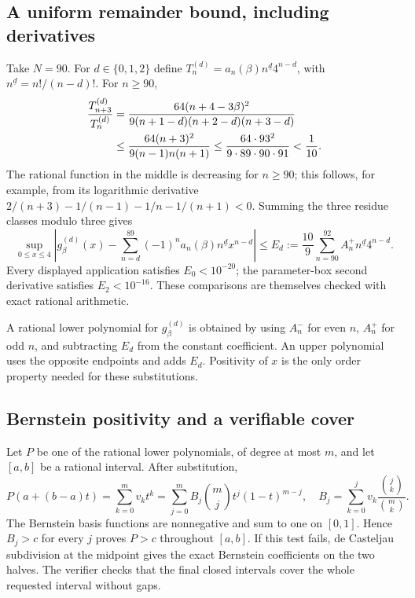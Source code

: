 \documentclass[11pt,a4paper]{article}
\numberwithin{equation}{section}
\theoremstyle{definition}\newtheorem{definition}[theorem]{Definition}
\theoremstyle{remark}\newtheorem{remark}[theorem]{Remark}
\begin{document}
\subsection{A uniform remainder bound, including derivatives}

Take \(N=90\). For \(d\in\{0,1,2\}\) define
\(T_n^{(d)}=a_n(\beta)n^{\underline d}4^{n-d}\), with
\(n^{\underline d}=n!/(n-d)!\). For \(n\ge90\),
\begin{align}
 \frac{T_{n+3}^{(d)}}{T_n^{(d)}}
 &=\frac{64(n+4-3\beta)^2}
 {9(n+1-d)(n+2-d)(n+3-d)}\notag\\
 &\le\frac{64(n+3)^2}{9(n-1)n(n+1)}
 \le\frac{64\cdot93^2}{9\cdot89\cdot90\cdot91}
 <\frac1{10}.\label{eq:tail-ratio}
\end{align}
The rational function in the middle is decreasing for \(n\ge90\);
this follows, for example, from its logarithmic derivative
\(2/(n+3)-1/(n-1)-1/n-1/(n+1)<0\).
Summing the three residue classes modulo three gives
\begin{equation}\label{eq:tail-cert}
 \sup_{0\le x\le4}\left|
 g_\beta^{(d)}(x)-\sum_{n=d}^{89}(-1)^n
 a_n(\beta)n^{\underline d}x^{n-d}\right|
 \le E_d:=\frac{10}{9}
 \sum_{n=90}^{92}A_n^+n^{\underline d}4^{n-d}.
\end{equation}
Every displayed application satisfies \(E_0<10^{-20}\); the
parameter-box second derivative satisfies \(E_2<10^{-16}\).
These comparisons are themselves checked with exact rational arithmetic.

A rational lower polynomial for \(g_\beta^{(d)}\) is obtained by
using \(A_n^-\) for even \(n\), \(A_n^+\) for odd \(n\), and
subtracting \(E_d\) from the constant coefficient. An upper polynomial
uses the opposite endpoints and adds \(E_d\). Positivity of \(x\)
is the only order property needed for these substitutions.

\subsection{Bernstein positivity and a verifiable cover}

Let \(P\) be one of the rational lower polynomials, of degree at most
\(m\), and let \([a,b]\) be a rational interval. After substitution,
\[
 P(a+(b-a)t)=\sum_{k=0}^{m}v_kt^k
 =\sum_{j=0}^{m}B_j\binom mj t^j(1-t)^{m-j},
 \quad
 B_j=\sum_{k=0}^{j}v_k\frac{\binom jk}{\binom mk}.
\]
The Bernstein basis functions are nonnegative and sum to one on
\([0,1]\). Hence \(B_j>c\) for every \(j\) proves \(P>c\)
throughout \([a,b]\). If this test fails, de Casteljau subdivision
at the midpoint gives the exact Bernstein coefficients on the two
halves. The verifier checks that the final closed intervals cover the
whole requested interval without gaps.
\end{document}
